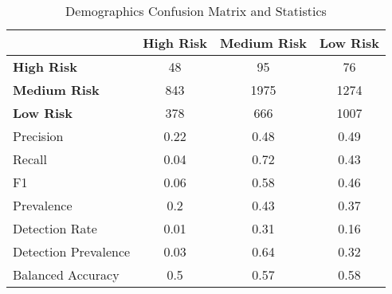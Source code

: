 \begin{table}[!htbp]
    \small
    \centering
    \caption{Demographics Confusion Matrix and Statistics}
    \label{tab:dem_confusion}
    \begin{tabular}{lccc}
        \toprule
        & \textbf{High Risk} & \textbf{Medium Risk} & \textbf{Low Risk} \\
        \midrule
        \textbf{High Risk} & 48 & 95 & 76 \\
        \textbf{Medium Risk} & 843 & 1975 & 1274 \\
        \textbf{Low Risk} & 378 & 666 & 1007 \\
        \bottomrule
        \midrule
        Precision & 0.22 & 0.48 & 0.49 \\
        Recall & 0.04 & 0.72 & 0.43 \\
        F1 & 0.06 & 0.58 & 0.46 \\
        Prevalence & 0.2 & 0.43 & 0.37 \\
        Detection Rate & 0.01 & 0.31 & 0.16 \\
        Detection Prevalence & 0.03 & 0.64 & 0.32 \\
        Balanced Accuracy & 0.5 & 0.57 & 0.58 \\
        \bottomrule
    \end{tabular}
\end{table}